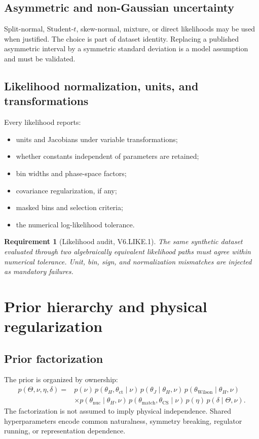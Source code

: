 \documentclass[11pt]{article}
\newtheorem{requirement}[definition]{Requirement}
\newcommand{\matchp}{\mathrm{match}}
\newcommand{\CS}{\ensuremath{\mathrm{CS}}}
\newcommand{\wil}{\mathrm{Wilson}}
\newcommand{\nuc}{\mathrm{nuc}}
\begin{document}
\subsection{Asymmetric and non-Gaussian uncertainty}

Split-normal, Student-\(t\), skew-normal, mixture, or direct likelihoods may be
used when justified.  The choice is part of dataset identity.  Replacing a
published asymmetric interval by a symmetric standard deviation is a model
assumption and must be validated.

\subsection{Likelihood normalization, units, and transformations}

Every likelihood reports:
\begin{itemize}
\item units and Jacobians under variable transformations;
\item whether constants independent of parameters are retained;
\item bin widths and phase-space factors;
\item covariance regularization, if any;
\item masked bins and selection criteria;
\item the numerical log-likelihood tolerance.
\end{itemize}

\begin{requirement}[Likelihood audit, V6.LIKE.1]
The same synthetic dataset evaluated through two algebraically equivalent
likelihood paths must agree within numerical tolerance.  Unit, bin, sign, and
normalization mismatches are injected as mandatory failures.
\end{requirement}

\section{Prior hierarchy and physical regularization}
\label{sec:priors}

\subsection{Prior factorization}

The prior is organized by ownership:
\begin{align}
 p(\Theta,\nu,\eta,\delta)
 ={}&
 p(\nu)\,
 p(\theta_H,\theta_{\mathrm{ct}}\mid\nu)\,
 p(\theta_J\mid\theta_H,\nu)\,
 p(\theta_{\wil}\mid\theta_H,\nu)
 \nonumber\\
 &\times
 p(\theta_{\nuc}\mid\theta_H,\nu)\,
 p(\theta_{\matchp},\theta_{\CS}\mid\nu)\,
 p(\eta)\,
 p(\delta\mid\Theta,\nu).
 \label{eq:prior-factorization}
\end{align}
The factorization is not assumed to imply physical independence.  Shared
hyperparameters encode common naturalness, symmetry breaking, regulator
running, or representation dependence.
\end{document}
